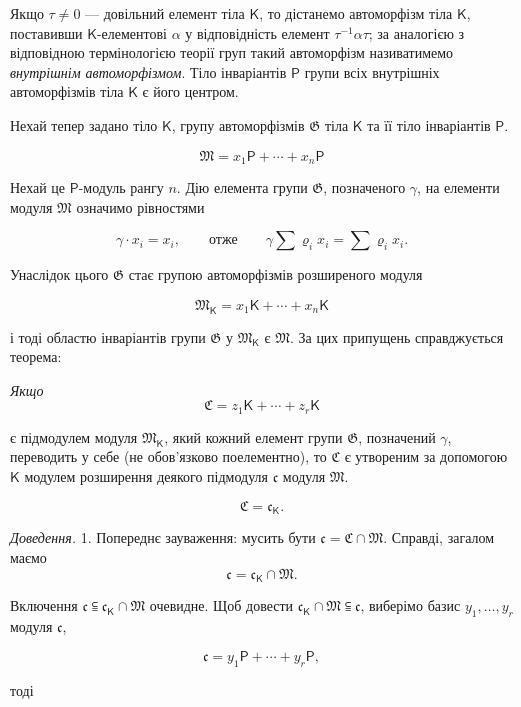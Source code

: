 \documentclass[11pt]{article}
\begin{document}
Якщо \(\tau\ne 0\) --- довільний елемент тіла \(\mathsf K\), то дістанемо автоморфізм тіла \(\mathsf K\), поставивши \(\mathsf K\)-елементові \(\alpha\) у відповідність елемент \(\tau^{-1}\alpha\tau\); за аналогією з відповідною термінологією теорії груп такий автоморфізм називатимемо \emph{внутрішнім автоморфізмом}. Тіло інваріантів \(\mathsf P\) групи всіх внутрішніх автоморфізмів тіла \(\mathsf K\) є його центром.

Нехай тепер задано тіло \(\mathsf K\), групу автоморфізмів \(\mathfrak G\) тіла \(\mathsf K\) та її тіло інваріантів \(\mathsf P\).

\[
\mathfrak M=x_1\mathsf P+\cdots+x_n\mathsf P
\]

Нехай це \(\mathsf P\)-модуль рангу \(n\). Дію елемента групи \(\mathfrak G\), позначеного \(\gamma\), на елементи модуля \(\mathfrak M\) означимо рівностями

\[
\gamma\cdot x_i=x_i,\qquad\text{отже}\qquad
\gamma\sum \varrho_i x_i=\sum \varrho_i x_i.
\]

Унаслідок цього \(\mathfrak G\) стає групою автоморфізмів розширеного модуля

\[
\mathfrak M_{\mathsf K}=x_1\mathsf K+\cdots+x_n\mathsf K
\]

і тоді областю інваріантів групи \(\mathfrak G\) у \(\mathfrak M_{\mathsf K}\) є \(\mathfrak M\). За цих припущень справджується теорема:

\begingroup\itshape
Якщо
\[
\mathfrak C=z_1\mathsf K+\cdots+z_r\mathsf K
\]

є підмодулем модуля \(\mathfrak M_{\mathsf K}\), який кожний елемент групи \(\mathfrak G\), позначений \(\gamma\), переводить у себе (не обов'язково поелементно), то \(\mathfrak C\) є утвореним за допомогою \(\mathsf K\) модулем розширення деякого підмодуля \(\mathfrak c\) модуля \(\mathfrak M\).

\[
\mathfrak C=\mathfrak c_{\mathsf K}.
\]
\endgroup

\emph{Доведення.} 1. Попереднє зауваження: мусить бути \(\mathfrak c=\mathfrak C\cap\mathfrak M\). Справді, загалом маємо
\[
\mathfrak c=\mathfrak c_{\mathsf K}\cap\mathfrak M.
\]

Включення \(\mathfrak c\subseteqq\mathfrak c_{\mathsf K}\cap\mathfrak M\) очевидне. Щоб довести \(\mathfrak c_{\mathsf K}\cap\mathfrak M\subseteqq\mathfrak c\), виберімо базис \(y_1,\ldots,y_r\) модуля \(\mathfrak c\),

\[
\mathfrak c=y_1\mathsf P+\cdots+y_r\mathsf P,
\]

тоді
\end{document}
